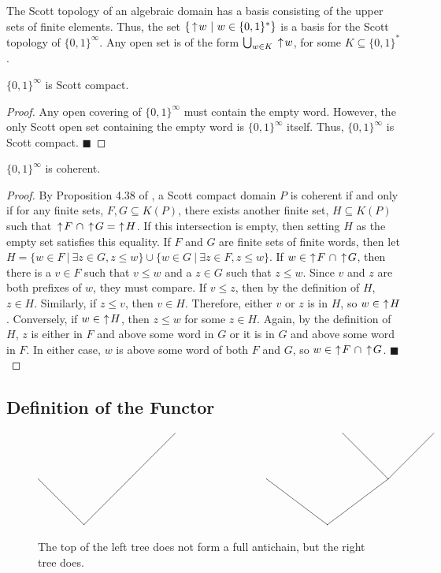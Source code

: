 The Scott topology of an algebraic domain has a basis consisting of the upper sets of finite elements.  Thus, the set $\{\,\uparrow\! w\ |\ w \in \{0,1\}^{*}\}$ is a basis for the Scott topology of $\{0,1\}^\infty$.  Any open set is of the form $\bigcup_{w\in K} \,\uparrow\! w$, for some $K\subseteq \{0,1\}^{*}$.

\begin{proposition}
$\{0,1\}^\infty$ is Scott compact.
\end{proposition}
\begin{proof}
Any open covering of $\{0,1\}^\infty$ must contain the empty word.  However, the only Scott open set containing the empty word is $\{0,1\}^\infty$ itself.  Thus, $\{0,1\}^\infty$ is Scott compact.
\hfill $\blacksquare$
\end{proof}

\begin{proposition}
$\{0,1\}^\infty$ is coherent.
\end{proposition}
\begin{proof}
By Proposition 4.38 of \cite{mislove1998topology}, a Scott compact domain $P$ is coherent if and only if for any finite sets, $F,G\subseteq K(P)$, there exists another finite set, $H\subseteq K(P)$ such that $\,\uparrow\! F \ \cap \,\uparrow\! G =\, \,\uparrow\! H$.  If this intersection is empty, then setting $H$ as the empty set satisfies this equality.  If $F$ and $G$ are finite sets of finite words, then let $H = \{w\in F\ |\ \exists z\in G, z\leq w\} \cup \{w\in G\ |\ \exists z\in F, z\leq w\}$.  If $w\in\, \,\uparrow\! F \ \cap \,\uparrow\! G$, then there is a $v\in F$ such that $v\leq w$ and a $z\in G$ such that $z\leq w$.  Since $v$ and $z$ are both prefixes of $w$, they must compare.  If $v\leq z$, then by the definition of $H$, $z\in H$.  Similarly, if $z\leq v$, then $v\in H$.  Therefore, either $v$ or $z$ is in $H$, so $w\in\, \,\uparrow\! H$.  Conversely, if $w\in\, \,\uparrow\! H$, then $z\leq w$ for some $z\in H$.  Again, by the definition of $H$, $z$ is either in $F$ and above some word in $G$ or it is in $G$ and above some word in $F$.  In either case, $w$ is above some word of both $F$ and $G$, so $w\in\, \,\uparrow\! F \ \cap \,\uparrow\! G$.
\hfill $\blacksquare$
\end{proof}

\subsection{Definition of the Functor}

\begin{figure}
\[
\begin{xy}
(45,30)*{} = "v0";
(0,15)*{} = "v1";%
(30,15)*{} = "v2";%
(15,0)*{} = "v3";%
(100,30)*{} = "v6";%
(130,30)*{} = "v7";%
(75,15)*{} = "v8";%
(115,15)*{} = "v9";%
(95,0)*{} = "v10";%
{\ar@{-} "v2"; "v0"};%
{\ar@{-} "v3"; "v1"};%
{\ar@{-} "v3"; "v2"};%
{\ar@{-} "v9"; "v6"};%
{\ar@{-} "v9"; "v7"};%
{\ar@{-} "v10"; "v8"};%
{\ar@{-} "v10"; "v9"};
\end{xy}
\]
\caption[Full Antichains]{The top of the left tree does not form a full antichain, but the right tree does.}
\end{figure}

